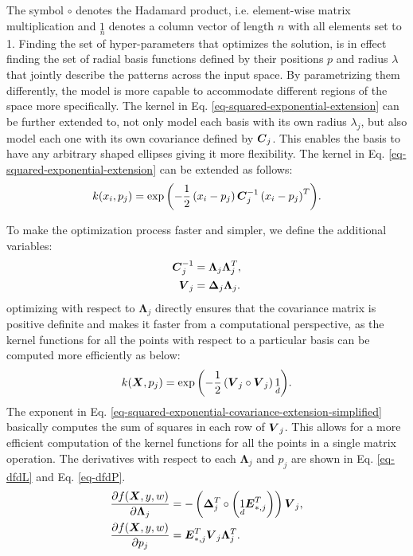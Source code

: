 \documentclass[useAMS,usenatbib,fleqn]{mn2e}
\begin{document}
The symbol $\circ$ denotes the Hadamard product, i.e. element-wise matrix multiplication and $\underset{n}{1}$ denotes a column vector of length $n$ with all elements set to 1. Finding the set of hyper-parameters that optimizes the solution, is in effect finding the set of radial basis functions defined by their positions $p$ and radius $\lambda$ that jointly describe the patterns across the input space. By parametrizing them differently, the model is more capable to accommodate different regions of the space more specifically. The kernel in Eq. \eqref{eq-squared-exponential-extension} can be further extended to, not only model each basis with its own radius $\lambda_{j}$, but also model each one with its own covariance defined by $\bmath{C}_{j}$. This enables the basis to have any arbitrary shaped ellipses giving it more flexibility. The kernel in Eq. \eqref{eq-squared-exponential-extension} can be extended as follows:
\begin{equation}
\label{eq-squared-exponential-covariance-extension}
k(x_{i},p_{j}) = \exp{\left(-\frac{1}{2}\left(x_{i}-p_{j}\right)\bmath{C}_{j}^{-1}\left(x_{i}-p_{j}\right)^{T}\right)}.
\end{equation}

To make the optimization process faster and simpler, we define the additional variables:
\begin{subequations}
\begin{align}
\label{eq-Cinv}
\bmath{C}_{j}^{-1} &= \mathbf\Lambda_{j}\mathbf\Lambda_{j}^{T},\\
\label{eq-V_j}
\bmath{V}_{j} &= \mathbf\Delta_{j}\mathbf\Lambda_{j}.
\end{align}
\end{subequations}
optimizing with respect to $\mathbf\Lambda_{j}$ directly ensures that the covariance matrix is positive definite and makes it faster from a computational perspective, as the kernel functions for all the points with respect to a particular basis can be computed more efficiently as below:
\begin{equation}
\label{eq-squared-exponential-covariance-extension-simplified}
k(\bmath{X},p_{j}) = \exp{\left(-\frac{1}{2}\left(\bmath{V}_{j}\circ \bmath{V}_{j}\right)\underset{d}{1}\right)}.
\end{equation}
The exponent in Eq. \eqref{eq-squared-exponential-covariance-extension-simplified} basically computes the sum of squares in each row of $\bmath{V}_{j}$. This allows for a more efficient computation of the kernel functions for all the points in a single matrix operation. The derivatives with respect to each $\mathbf\Lambda_{j}$ and $p_{j}$ are shown in Eq. \eqref{eq-dfdL} and Eq. \eqref{eq-dfdP}.
\begin{subequations}
\begin{align}
\label{eq-dfdL}
\frac{\partial f(\bmath{X},y,w)}{\partial \mathbf\Lambda_{j}} &= -\left( \mathbf\Delta_{j}^{T}\circ \left(\underset{d}{1}\bmath{E}_{*,j}^{T}\right) \right)\bmath{V}_{j},\\
\label{eq-dfdP}
\frac{\partial f(\bmath{X},y,w)}{\partial p_{j}} &= \bmath{E}_{*,j}^{T}\bmath{V}_{j}\mathbf\Lambda_{j}^{T}.
\end{align}
\end{subequations}
\end{document}

